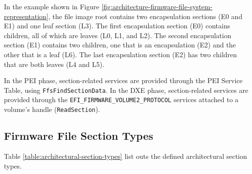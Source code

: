In the example shown in Figure \ref{fig:architecture-firmware-file-system-representation}, the file image root contains two encapsulation sections (E0 and E1) and one leaf section (L3). The first encapsulation section (E0) contains children, all of which are leaves (L0, L1, and L2). The second encapsulation section (E1) contains two children, one that is an encapsulation (E2) and the other that is a leaf (L6). The last encapsulation section (E2) has two children that are both leaves (L4 and L5).

In the PEI phase, section-related services are provided through the PEI Service Table, using \verb|FfsFindSectionData|. In the DXE phase, section-related services are provided through the \verb|EFI_FIRMWARE_VOLUME2_PROTOCOL| services attached to a volume's handle (\verb|ReadSection|).

\subsection{Firmware File Section Types}
Table \ref{table:architectural-section-types} list outs the defined architectural section types.

